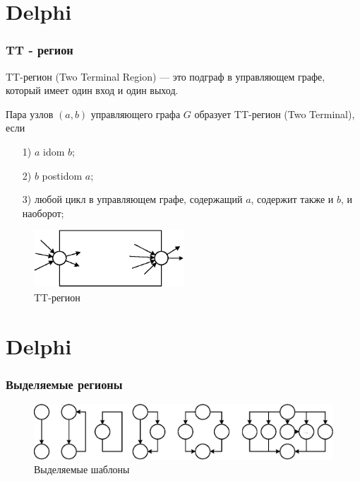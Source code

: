\documentclass{beamer}
\begin{document}
\section{Delphi}
\begin{frame}
\frametitle{TT - регион}

\scriptsize{
\newtheorem{TT}{Definition}[section]
\begin{Def}
	TT-регион (Two Terminal Region) --- это подграф в управляющем графе, который имеет один вход и один выход.
\end{Def}

\newtheorem{TTreg}{Definition}[section]
\begin{Def}
	Пара узлов $(a, b)$ управляющего графа $G$ образует TT-регион (Two Terminal), если
	\begin{enumerate}
		\item[1)]
			$a$ idom $b$;
		\item[2)]
			$b$ postidom $a$;
		\item[3)]
			любой цикл в управляющем графе, содержащий $a$, содержит также и $b$, и наоборот;
	\end{enumerate}
\end{Def}


\begin{figure}[htbp]
	\centering
		\includegraphics[width=0.5\textwidth]{Pic/TTRegion.eps}
	\caption{TT-регион}
	\label{fig:TTRegion}
\end{figure}
}

\end{frame}


\section{Delphi}
\begin{frame}
\frametitle{Выделяемые регионы}
\begin{figure}[htbp]
	\centering
		\includegraphics[width=1\textwidth]{Pic/Reg.eps}
	\caption{Выделяемые шаблоны}
	\label{fig:Regions}
\end{figure}
\end{frame}
\end{document}

